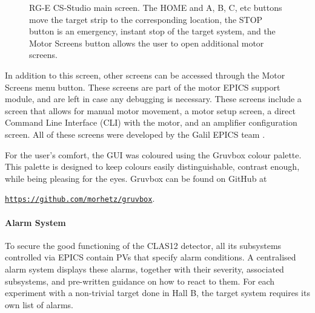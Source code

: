         \begin{figure}[t!]
            \centering{}
            \caption[RG-E CS-Studio main screen]{RG-E CS-Studio main screen. The HOME and A, B, C, etc buttons move the target strip to the corresponding location, the STOP button is an emergency, instant stop of the target system, and the Motor Screens button allows the user to open additional motor screens.}
            \label{fig::rge_motorx}
        \end{figure}

        In addition to this screen, other screens can be accessed through the Motor Screens menu button.
        These screens are part of the motor EPICS support module, and are left in case any debugging is necessary.
        These screens include a screen that allows for manual motor movement, a motor setup screen, a direct Command Line Interface (CLI) with the motor, and an amplifier configuration screen.
        All of these screens were developed by the Galil EPICS team \cite{farnswort2009}.
        
        For the user's comfort, the GUI was coloured using the Gruvbox colour palette.
        This palette is designed to keep colours easily distinguishable, contrast enough, while being pleasing for the eyes.
        Gruvbox can be found on GitHub at

        \begin{center}
            \hyperlink{https://github.com/morhetz/gruvbox}{\texttt{https://github.com/morhetz/gruvbox}}.
        \end{center}

    \paragraph{Alarm System}
        To secure the good functioning of the CLAS12 detector, all its subsystems controlled via EPICS contain PVs that specify alarm conditions.
        A centralised alarm system displays these alarms, together with their severity, associated subsystems, and pre-written guidance on how to react to them.
        For each experiment with a non-trivial target done in Hall B, the target system requires its own list of alarms.

